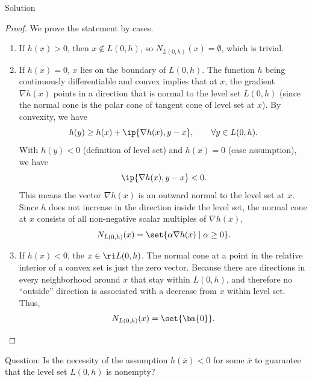\documentclass{article}
\theoremstyle{plain}
\theoremstyle{definition}
\theoremstyle{remark}
\begin{document}
\begin{solution}
    {Solution}
    \begin{proof}
        We prove the statement by cases.
        \begin{enumerate}
            \item If $h(x)>0$, then $x\notin L(0,h)$, so $N_{L(0,h)}(x)=\emptyset$, which is trivial.
            \item If $h(x)=0$, $x$ lies on the boundary of $L(0, h)$. The function $h$ being continuously differentiable and convex implies that at $x$, the gradient $\nabla h(x)$ points in a direction that is normal to the level set $L(0, h)$ (since the normal cone is the polar cone of tangent cone of level set at $x$). By convexity, we have \[h(y)\geq h(x)+\ip{\nabla h(x), y-x}, \qquad \forall y\in L(0, h).\] With $h(y)<0$ (definition of level set) and $h(x)=0$ (case assumption), we have \[\ip{\nabla h(x), y-x}<0.\] This means the vector $\nabla h(x)$ is an outward normal to the level set at $x$. Since $h$ does not increase in the direction inside the level set, the normal cone at $x$ consists of all non-negative scalar multiples of $\nabla h(x)$, \ie \[N_{L(0,h)}(x)=\set{\alpha\nabla h(x)\mid \alpha\geq 0}.\]
            \item If $h(x)<0$, the $x\in\ri L(0, h)$. The normal cone at a point in the relative interior of a convex set is just the zero vector. Because there are directions in every neighborhood around $x$ that stay within $L(0, h)$, and therefore no ``outside'' direction is associated with a decrease from $x$ within level set. Thus, \[N_{L(0,h)}(x)=\set{\bm{0}}.\]
        \end{enumerate}
    \end{proof}
    Question: Is the necessity of the assumption $h(\bar{x})<0$ for some $\bar{x}$ to guarantee that the level set $L(0,h)$ is nonempty?
\end{solution}
\end{document}
